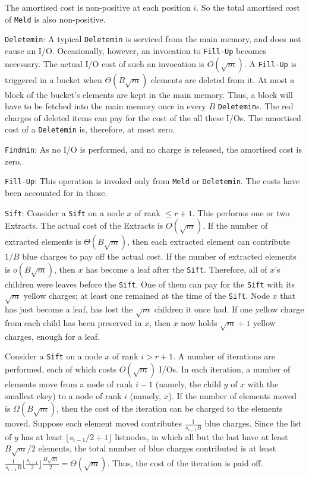 The amortised cost is non-positive at each position $i$. 
So the total amortised cost of {\tt Meld} is also non-positive.


{\tt Deletemin}:
A typical {\tt Deletemin} is serviced from the main memory, and does
not cause an I/O. Occasionally, however, an invocation
to {\tt Fill-Up} becomes necessary. The actual I/O cost
of such an invocation is $O(\sqrt{m})$. A {\tt Fill-Up} is triggered
in a bucket when $\Theta(B\sqrt{m})$ elements are deleted from it.
At most a block of the bucket's elements are kept in the main memory.
Thus, a block will have to be fetched into the main memory once in every
$B$ {\tt Deletemin}s. 
The red charges of deleted items can pay for the cost of the all these I/Os.  
The amortised cost of a {\tt Deletemin} is, therefore, at most zero.

{\tt Findmin}: As no I/O is performed, and no charge is released,
the amortised cost is zero.

{\tt Fill-Up}:
This operation is invoked only from {\tt Meld} or {\tt Deletemin}.
The costs have been accounted for in those.

{\tt Sift}:
Consider a {\tt Sift} on a node $x$ of rank $\leq r+1$.
This performs one or two Extracts. The actual cost of the Extracts is $O(\sqrt{m})$.
If the number of extracted elements is $\Theta(B\sqrt{m})$,
	then each extracted element can contribute $1/B$ blue charges 
	to pay off the actual cost.
If the number of extracted elements is $o(B\sqrt{m})$, then
$x$ has become a leaf after the {\tt Sift}.
Therefore, all of $x$'s children were leaves before the {\tt Sift}. 
One of them can pay for the {\tt Sift} with its $\sqrt{m}$ yellow charges;
	at least one remained at the time of the {\tt Sift}.
Node $x$ that has just become a leaf, has lost the $\sqrt{m}$ children 
	it once had. 
If one yellow charge from each child has been preserved in $x$, then
	$x$ now holds $\sqrt{m}+1$ yellow charges, enough for a leaf.

Consider a {\tt Sift} on a node $x$ of rank $i > r+1$.
A number of iterations are performed, each of which costs $O(\sqrt{m})$ I/Os.
In each iteration, a number of elements move from a node of rank 
$i-1$ (namely, the child $y$ of $x$ with the smallest ckey) to a node of rank $i$
(namely, $x$). If the number of elements moved is $\Omega(B\sqrt{m})$, then
the cost of the iteration can be charged to the elements moved. 
Suppose each element moved contributes $\frac{1}{s_{i-1}B}$ blue charges.
Since the list of $y$ has at least $\lfloor s_{i-1}/2 + 1\rfloor$ listnodes,
in which all but the last have at least $B\sqrt{m}/2$ elements, the total number of
blue charges contributed is at least 
$\frac{1}{s_{i-1}B}\lfloor \frac{s_{i-1}}{2}\rfloor \frac{B\sqrt{m}}{2} =\Theta{(\sqrt{m})}$. 
Thus, the cost of the
	iteration is paid off.

